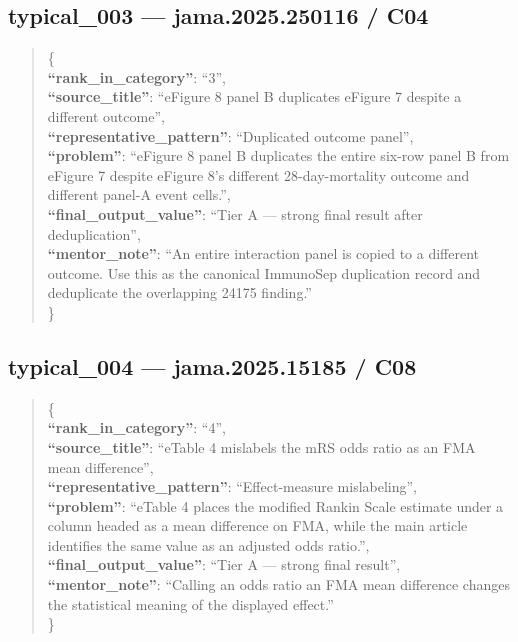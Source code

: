 \documentclass[
  letterpaper,
  9pt]{extreport}
\begin{document}
\hypertarget{typical_003--jama2025250116--c04}{%
\subsection{typical\_003 --- jama.2025.250116 /
C04}\label{typical_003--jama2025250116--c04}}

\begin{quote}
\{\\
\textbf{``rank\_in\_category''}: ``3'',\\
\textbf{``source\_title''}: ``eFigure 8 panel B duplicates eFigure 7
despite a different outcome'',\\
\textbf{``representative\_pattern''}: ``Duplicated outcome panel'',\\
\textbf{``problem''}: ``eFigure 8 panel B duplicates the entire six-row
panel B from eFigure 7 despite eFigure 8's different 28-day-mortality
outcome and different panel-A event cells.'',\\
\textbf{``final\_output\_value''}: ``Tier A --- strong final result
after deduplication'',\\
\textbf{``mentor\_note''}: ``An entire interaction panel is copied to a
different outcome. Use this as the canonical ImmunoSep duplication
record and deduplicate the overlapping 24175 finding.''\\
\}
\end{quote}

\hypertarget{typical_004--jama202515185--c08}{%
\subsection{typical\_004 --- jama.2025.15185 /
C08}\label{typical_004--jama202515185--c08}}

\begin{quote}
\{\\
\textbf{``rank\_in\_category''}: ``4'',\\
\textbf{``source\_title''}: ``eTable 4 mislabels the mRS odds ratio as
an FMA mean difference'',\\
\textbf{``representative\_pattern''}: ``Effect-measure mislabeling'',\\
\textbf{``problem''}: ``eTable 4 places the modified Rankin Scale
estimate under a column headed as a mean difference on FMA, while the
main article identifies the same value as an adjusted odds ratio.'',\\
\textbf{``final\_output\_value''}: ``Tier A --- strong final result'',\\
\textbf{``mentor\_note''}: ``Calling an odds ratio an FMA mean
difference changes the statistical meaning of the displayed effect.''\\
\}
\end{quote}
\end{document}

